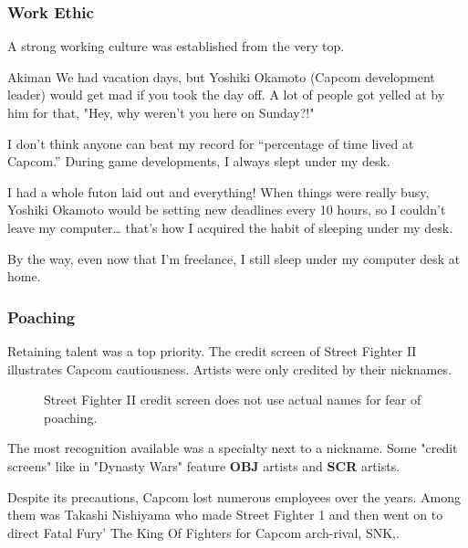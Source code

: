 \subsubsection{Work Ethic}

A strong working culture was established from the very top.

\begin{q}{Akiman\cite{akiman2003}}
  We had vacation days, but Yoshiki Okamoto (Capcom development leader) would get mad if you took the day off. A lot of people got yelled at by him for that, "Hey, why weren't you here on Sunday?!"

  I don't think anyone can beat my record for “percentage of time lived at Capcom.” During game developments, I always slept under my desk. 

  I had a whole futon laid out and everything! When things were really busy, Yoshiki Okamoto  would be setting new deadlines every 10 hours, so I couldn't leave my computer… that's how I acquired the habit of sleeping under my desk. 

  By the way, even now that I'm freelance, I still sleep under my computer desk at home.
  \end{q}

\subsubsection{Poaching}


Retaining talent was a top priority. The credit screen of Street Fighter II illustrates Capcom cautiousness. Artists were only credited by their nicknames.

 \begin{figure}[H]
\caption*{Street Fighter II credit screen does not use actual names for fear of poaching.}
\end{figure}

\begin{trivia}
The most recognition available was a specialty next to a nickname. Some "credit screens" like in "Dynasty Wars" feature \textbf{OBJ} artists and \textbf{SCR} artists.
\end{trivia}







Despite its precautions, Capcom lost numerous employees over the years. Among them was Takashi Nishiyama who made Street Fighter 1 and then went on to direct Fatal Fury' The King Of Fighters for Capcom arch-rival, SNK\cite{YoshikiOkamotoTakashiNishiyama},.
 










